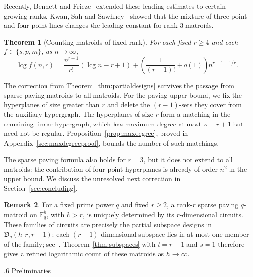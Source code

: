 \documentclass[11pt,reqno]{amsart}
\makeatletter
\numberwithin{equation}{section}
\renewcommand{\section}{\@startsection{section}{1}%
    \z@{1.3\linespacing\@plus.5\linespacing\@minus.2\linespacing}%
    {.6\linespacing}%
    {\normalfont\scshape\centering}}
\theoremstyle{plain}
\newtheorem{theorem}{Theorem}[section]
\theoremstyle{definition}
\newtheorem{remark}[theorem]{Remark}
\makeatother
\begin{document}
Recently, Bennett and Frieze~\cite[Theorems~2 and~3]{BF} extended these leading estimates to certain growing ranks.
Kwan, Sah and Sawhney~\cite{KSSMatroids} showed that the mixture of three-point and four-point lines changes the leading constant for rank-$3$ matroids.

\begin{theorem}[Counting matroids of fixed rank]\label{thm:matroids}
    For each fixed $r\ge4$ and each $f\in\{s,p,m\}$, as $n\to\infty$,
    \[
        \log f(n,r)=\frac{n^{r-1}}{r!}(\log n-r+1)
        +\left(\frac1{(r-1)!}+o(1)\right)n^{r-1-1/r}.
    \]
\end{theorem}

The correction from Theorem~\ref{thm:partialdesigns} survives the passage from sparse paving matroids to all matroids.
For the paving upper bound, we fix the hyperplanes of size greater than $r$ and delete the $(r-1)$-sets they cover from the auxiliary hypergraph.
The hyperplanes of size $r$ form a matching in the remaining linear hypergraph, which has maximum degree at most $n-r+1$ but need not be regular.
Proposition~\ref{prop:maxdegree}, proved in Appendix~\ref{sec:maxdegreeproof}, bounds the number of such matchings.

The sparse paving formula also holds for $r=3$, but it does not extend to all matroids: the contribution of four-point hyperplanes is already of order $n^2$ in the upper bound.
We discuss the unresolved next correction in Section~\ref{sec:concluding}.

\begin{remark}
    For a fixed prime power $q$ and fixed $r\ge2$, a rank-$r$ sparse paving $q$-matroid on $\mathbb F_q^h$, with $h>r$, is uniquely determined by its $r$-dimensional circuits.
    These families of circuits are precisely the partial subspace designs in $\mathfrak D_q(h,r,r-1)$: each $(r-1)$-dimensional subspace lies in at most one member of the family; see~\cite[Definition~5 and Proposition~12]{JJP}.
    Theorem~\ref{thm:subspaces} with $t=r-1$ and $s=1$ therefore gives a refined logarithmic count of these matroids as $h\to\infty$.
\end{remark}


\section{Preliminaries}\label{sec:prelim}

\end{document}
